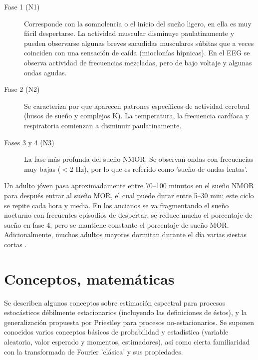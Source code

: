 \documentclass[12pt,a4paper]{mitthesis}
\begin{document}
\begin{description}
\item[Fase 1 (N1)] Corresponde con la somnolencia o el inicio del sue\~no ligero, en ella es muy 
f\'acil despertarse. La actividad muscular disminuye paulatinamente y pueden observarse algunas 
breves sacudidas musculares s\'ubitas que a veces coinciden con una sensación de ca\'ida 
(mioclon\'ias h\'ipnicas). En el EEG se observa actividad de frecuencias mezcladas, pero de bajo 
voltaje y algunas ondas agudas. 

\item[Fase 2 (N2)] Se caracteriza por que aparecen patrones espec\'ificos de actividad 
cerebral (husos de sue\~no y complejos K). La temperatura, la frecuencia card\'iaca y respiratoria 
comienzan a disminuir paulatinamente. 

\item[Fases 3 y 4 (N3)] La fase m\'as profunda del sue\~no NMOR. Se observan ondas con frecuencias 
muy bajas ($<2$ Hz), por lo que es referido como 'sue\~no de ondas lentas'.
\end{description}

Un adulto j\'oven pasa aproximadamente entre 70--100 minutos en el sue\~no NMOR para despu\'es 
entrar al sue\~no MOR, el cual puede durar entre 5--30 min; este ciclo se repite cada hora y media.
En los ancianos se va fragmentando el sue\~no nocturno con frecuentes episodios de despertar, se 
reduce mucho el porcentaje de sue\~no en fase 4, pero se mantiene constante el porcentaje de 
sue\~no MOR. Adicionalmente, muchos adultos mayores dormitan durante el d\'ia varias siestas 
cortas \cite{CarrilloMora}.


\section{Conceptos, matem\'aticas}

Se describen algunos conceptos sobre estimaci\'on espectral para procesos estoc\'asticos 
d\'ebilmente estacionarios (incluyendo las definiciones de \'estos), y la generalizaci\'on 
propuesta por Priestley para procesos no-estacionarios. 
Se suponen conocidos varios conceptos b\'asicos de probabilidad y estad\'istica (variable 
aleatoria, valor esperado y momentos, estimadores), as\'i como cierta familiaridad con la 
transformada de Fourier 'cl\'asica' y sus propiedades.
\end{document}
